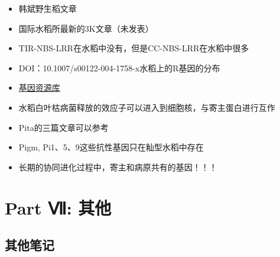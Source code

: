 \documentclass[
  10pt,
]{book}
\begin{document}
\begin{itemize}
\item
  韩斌野生稻文章
\item
  国际水稻所最新的3K文章（未发表）
\item
  TIR-NBS-LRR在水稻中没有，但是CC-NBS-LRR在水稻中很多
\item
  DOI：10.1007/s00122-004-1758-x水稻上的R基因的分布
\item
  \href{http://shigen.nig.ac.jp/shigen/index.jsp}{基因资源库}
\item
  水稻白叶枯病菌释放的效应子可以进入到细胞核，与寄主蛋白进行互作
\item
  Pita的三篇文章可以参考
\item
  Pigm, Pi1、5、9这些抗性基因只在籼型水稻中存在
\item
  长期的协同进化过程中，寄主和病原共有的基因！！！
\end{itemize}

\hypertarget{part-part-ux2176-ux5176ux4ed6}{%
\part*{Part Ⅶ: 其他}\label{part-part-ux2176-ux5176ux4ed6}}

\hypertarget{other}{%
\chapter{其他笔记}\label{other}}

\printbibliography
\end{document}
